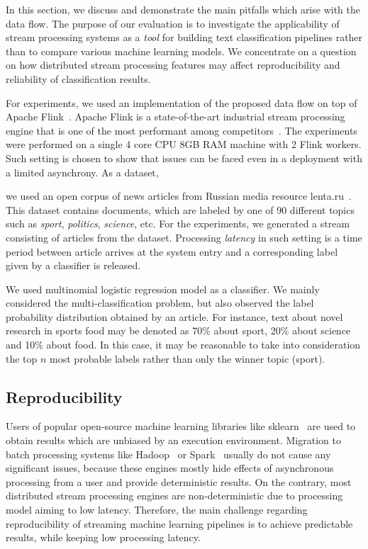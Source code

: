 \label {fs-discussion}

In this section, we discuss and demonstrate the main pitfalls which arise with the data flow. The purpose of our evaluation is to investigate the applicability of stream processing systems as a {\em tool} for building text classification pipelines rather than to compare various machine learning models. We concentrate on a question on how distributed stream processing features may affect reproducibility and reliability of classification results.

For experiments, we used an implementation of the proposed data flow on top of Apache Flink~\cite{Carbone:2017:SMA:3137765.3137777}. Apache Flink is a state-of-the-art industrial stream processing engine that is one of the most performant among competitors~\cite{karimov2018benchmarking, S7530084}. The experiments were performed on a single 4 core CPU 8GB RAM machine with 2 Flink workers. Such setting is chosen to show that issues can be faced even in a deployment with a limited asynchrony. As a dataset, 

we used an open corpus of news articles from Russian media resource lenta.ru~\cite{lentaru}. This dataset contains documents, which are labeled by one of 90 different topics such as {\em sport}, {\em politics}, {\em science}, etc. For the experiments, we generated a stream consisting of articles from the dataset. Processing {\em latency} in such setting is a time period between article arrives at the system entry and a corresponding label given by a classifier is released. 

We used multinomial logistic regression model as a classifier. We mainly considered the multi-classification problem, but also observed the label probability distribution obtained by an article. For instance, text about novel research in sports food may be denoted as 70\% about sport, 20\% about science and 10\% about food. In this case, it may be reasonable to take into consideration the top $n$ most probable labels rather than only the winner topic (sport).

\subsection{Reproducibility}

Users of popular open-source machine learning libraries like sklearn~\cite{sklearn_api} are used to obtain results which are unbiased by an execution environment. Migration to batch processing systems like Hadoop~\cite{hadoop2009hadoop} or Spark~\cite{Zaharia:2016:ASU:3013530.2934664} usually do not cause any significant issues, because these engines mostly hide effects of asynchronous processing from a user and provide deterministic results. On the contrary, most distributed stream processing engines are non-deterministic due to processing model aiming to low latency. Therefore, the main challenge regarding reproducibility of streaming machine learning pipelines is to achieve predictable results, while keeping low processing latency.


